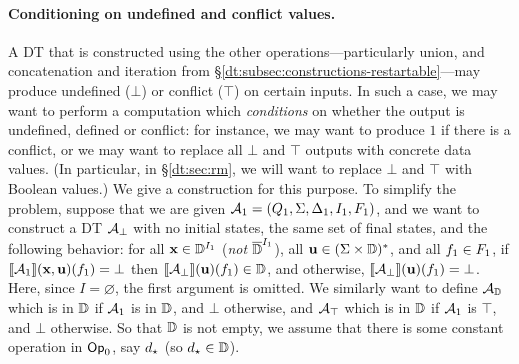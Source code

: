 \begin{figure*}[h]

\label{dt:fig:prefix-sum}
\end{figure*}

\paragraph*{Conditioning on undefined and conflict values.}
A DT that is constructed using the other operations---particularly union, and concatenation and iteration from \S\ref{dt:subsec:constructions-restartable}---may produce undefined ($\bot$) or conflict ($\top$) on certain inputs. In such a case, we may want to perform a computation which \emph{conditions} on whether the output is undefined, defined or conflict: for instance, we may want to produce $1$ if there is a conflict, or we may want to replace all $\bot$ and $\top$ outputs with concrete data values. (In particular, in \S\ref{dt:sec:rm}, we will want to replace $\bot$ and $\top$ with Boolean values.) We give a construction for this purpose. To simplify the problem, suppose that we are given $\mathcal{A}_1 = (Q_{1}, \Sigma, \Delta_{1}, I_{1}, F_{1})$, and we want to construct a DT $\mathcal{A}_\bot$ with no initial states, the same set of final states, and the following behavior: for all $\textbf{x} \in \mathbb{D}^{I_1}$ (\emph{not} $\overline{\mathbb{D}{}}^{I_1}$), all $\textbf{u} \in (\Sigma \times \mathbb{D})^{*}$, and all $f_1 \in F_1$, if $\llbracket \mathcal{A}_1 \rrbracket(\textbf{x},\textbf{u})(f_1) = \bot$ then $\llbracket \mathcal{A}_\bot \rrbracket(\textbf{u})(f_1) \in \mathbb{D}$, and otherwise, $\llbracket \mathcal{A}_\bot \rrbracket(\textbf{u})(f_1) = \bot$. Here, since $I = \varnothing$, the first argument is omitted. We similarly want to define $\mathcal{A}_{\mathbb{D}}$ which is in $\mathbb{D}$ if $\mathcal{A}_1$ is in $\mathbb{D}$, and $\bot$ otherwise, and $\mathcal{A}_\top$ which is in $\mathbb{D}$ if $\mathcal{A}_1$ is $\top$, and $\bot$ otherwise.
So that $\mathbb{D}$ is not empty, we assume that there is some constant operation in $\textsf{Op}_0$, say $d_\star$ (so $d_\star \in \mathbb{D}$).

